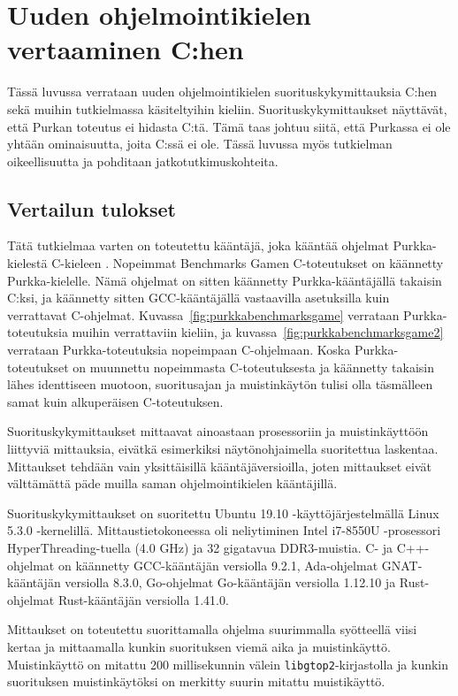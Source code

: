 \section{Uuden ohjelmointikielen vertaaminen C:hen}

Tässä luvussa verrataan uuden ohjelmointikielen suorituskykymittauksia C:hen
sekä muihin tutkielmassa käsiteltyihin kieliin. Suorituskykymittaukset
näyttävät, että Purkan toteutus ei hidasta C:tä. Tämä taas johtuu siitä, että
Purkassa ei ole yhtään ominaisuutta, joita C:ssä ei ole. Tässä luvussa myös
tutkielman oikeellisuutta ja pohditaan jatkotutkimuskohteita.

\subsection{Vertailun tulokset}
\label{sec:results}

Tätä tutkielmaa varten on toteutettu kääntäjä, joka kääntää ohjelmat
Purkka-kielestä C-kieleen \citep{purkka}. Nopeimmat Benchmarks Gamen
C-toteutukset on käännetty Purkka-kielelle. Nämä ohjelmat on sitten käännetty
Purkka-kääntäjällä takaisin C:ksi, ja käännetty sitten GCC-kääntäjällä
vastaavilla asetuksilla kuin verrattavat C-ohjelmat.
Kuvassa~\ref{fig:purkkabenchmarksgame} verrataan Purkka-toteutuksia muihin
verrattaviin kieliin, ja kuvassa~\ref{fig:purkkabenchmarksgame2} verrataan
Purkka-toteutuksia nopeimpaan C-ohjelmaan. Koska Purkka-toteutukset on
muunnettu nopeimmasta C-toteutuksesta ja käännetty takaisin lähes identtiseen
muotoon, suoritusajan ja muistinkäytön tulisi olla täsmälleen samat kuin
alkuperäisen C-toteutuksen.

Suorituskykymittaukset mittaavat ainoastaan prosessoriin ja muistinkäyttöön
liittyviä mittauksia, eivätkä esimerkiksi näytönohjaimella suoritettua
laskentaa. Mittaukset tehdään vain yksittäisillä kääntäjäversioilla, joten
mittaukset eivät välttämättä päde muilla saman ohjelmointikielen kääntäjillä.

Suorituskykymittaukset on suoritettu Ubuntu 19.10 -käyttöjärjestelmällä Linux
5.3.0 -kernelillä. Mittaustietokoneessa oli neliytiminen Intel i7-8550U
-prosessori Hy\-per\-Thread\-ing-tuella (4.0 GHz) ja 32 gigatavua DDR3-muistia.
C- ja C++-ohjelmat on käännetty GCC-kääntäjän versiolla 9.2.1, Ada-ohjelmat
GNAT-kääntäjän versiolla 8.3.0, Go-ohjelmat Go-kääntäjän versiolla 1.12.10 ja Rust-ohjelmat
Rust-kääntäjän versiolla 1.41.0.

Mittaukset on toteutettu suorittamalla ohjelma suurimmalla syötteellä viisi
kertaa ja mittaamalla kunkin suorituksen viemä aika ja muistinkäyttö.
Muistinkäyttö on mitattu 200 millisekunnin välein \texttt{libgtop2}-kirjastolla
ja kunkin suorituksen muistinkäytöksi on merkitty suurin mitattu muistikäyttö.

